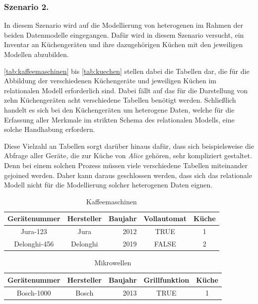 \subsubsection{Szenario 2.}
In diesem Szenario wird auf die Modellierung von heterogenen im Rahmen der beiden Datenmodelle eingegangen. Dafür wird in diesem Szenario versucht, ein Inventar an Küchengeräten und ihre dazugehörigen Küchen mit den jeweiligen Modellen abzubilden. 

\autoref{tab:kaffeemaschinen} bis \autoref{tab:kuechen} stellen dabei die Tabellen dar, die für die Abbildung der verschiedenen Küchengeräte und jeweiligen Küchen im relationalen Modell erforderlich sind. Dabei fällt auf das für die Darstellung von zehn Küchengeräten acht verschiedene Tabellen benötigt werden. Schließlich handelt es sich bei den Küchengeräten um heterogene Daten, welche für die Erfassung aller Merkmale im strikten Schema des relationalen Modells, eine solche Handhabung erfordern. 

Diese Vielzahl an Tabellen sorgt darüber hinaus dafür, dass sich beispielsweise die Abfrage aller Geräte, die zur Küche von \textit{Alice} gehören, sehr kompliziert gestaltet. Denn bei einem solchen Prozess müssen viele verschiedene Tabellen miteinander gejoined werden. Daher kann daraus geschlossen werden, dass sich das relationale Modell nicht für die Modellierung solcher heterogenen Daten eignen.

\begin{table}[!h]
    \centering
    \begin{tabular}{c|c|r|c|c}
    \hline
    \rowcolor[HTML]{EFEFEF} 
    \textbf{Gerätenummer} & \textbf{Hersteller} & \multicolumn{1}{c|}{\cellcolor[HTML]{EFEFEF}\textbf{Baujahr}} & \textbf{Vollautomat} & \textbf{Küche} \\ \hline
    Jura-123 & Jura & 2012 & TRUE & 1 \\
    Delonghi-456 & Delonghi & 2019 & FALSE & 2 \\ \hline
    \end{tabular}
    \caption{Kaffeemaschinen}
    \label{tab:kaffeemaschinen}
\end{table}

\begin{table}[!h]
    \centering
    \begin{tabular}{c|c|c|c|c}
    \hline
    \rowcolor[HTML]{EFEFEF} 
    \textbf{Gerätenummer} & \textbf{Hersteller} & \textbf{Baujahr} & \textbf{Grillfunktion} & \textbf{Küche} \\ \hline
    Bosch-1000 & Bosch & \multicolumn{1}{r|}{2013} & TRUE & 1 \\ \hline
    \end{tabular}
    \caption{Mikrowellen}
    \label{tab:mikrowellen}
\end{table}

